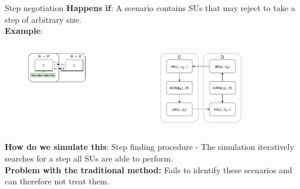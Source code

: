 \documentclass{beamer}
\begin{document}
\begin{frame}{Step negotiation}
    \textbf{Happens if}: A scenario contains SUs that may reject to take a step of arbitrary size.\\
    \textbf{Example}: 
    \begin{columns}[T] %
        \begin{column}{.48\textwidth}
            \begin{figure}    
                \includegraphics[width=0.9\textwidth]{images/step_scenario.pdf}
            \end{figure}
    \end{column}%
    \hfill%
    \begin{column}{.48\textwidth}
        \begin{figure}    
            \includegraphics[width=0.7\textwidth]{images/step_scenario_original.pdf}
        \end{figure}
    \end{column}%
    \end{columns}
    \textbf{How do we simulate this}: Step finding procedure - The simulation iteratively searches for a step all SUs are able to perform.\\
    \textbf{Problem with the traditional method:} Fails to identify these scenarios and can therefore not treat them.
\end{frame}
\end{document}
